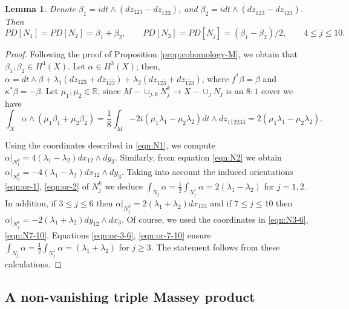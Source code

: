 \documentclass[10pt]{article}
\renewcommand{\b}{\beta}
\newcommand{\R}{\mathbb R}
\renewcommand{\b}{\beta}
\theoremstyle{plain}
\newtheorem{lem}[proposition]{Lemma}
\theoremstyle{definition}
\theoremstyle{remark}
\begin{document}
\begin{lem} \label{lem:PDuals}
Denote $\b_1=i dt\wedge (dz_{123} - dz_{\bar{1}\bar{2}\bar{3}})$, and  $\b_2=idt \wedge (dz_{12\bar{3}} - dz_{\bar{1}\bar{2}3})$. Then 
$$
PD[N_1]=PD[N_2]=\beta_1+\beta_2, \qquad 
PD[N_3]=PD[N_j]=(\beta_1 - \beta_2)/2, \qquad 4 \leq j \leq 10.
$$
\end{lem}
\begin{proof}
Following the proof of Proposition \ref{prop:cohomology-M}, we obtain that $\b_1,\beta_2\in H^4(X)$. Let $\alpha \in H^3(X)$; then, $\alpha=dt\wedge\beta + \lambda_1(dz_{123} + dz_{\bar{1}\bar{2}\bar{3}})+ \lambda_2( dz_{12\bar{3}} + dz_{\bar{1}\bar{2}{3}})$, where $f^*\beta=\beta$ and $\kappa^*\beta=-\beta$.  Let $\mu_1,\mu_2\in \R$, since $M-\cup_{j,k} N_j^k \to X-\cup_{j}N_j$ is an $8:1$ cover we have
$$
\int_X {\alpha \wedge (\mu_1\beta_1 + \mu_2\beta_2)}=
\frac{1}{8} \int_{M} {-2i(\mu_1 \lambda_1- \mu_2 \lambda_2)dt\wedge dz_{1\bar{1}2\bar{2}3\bar{3}}} =
2(\mu_1 \lambda_1- \mu_2 \lambda_2).
$$

Using the coordinates described in \eqref{eqn:N1}, we compute $\alpha|_{N_1^k}= 4(\lambda_1-\lambda_2)dx_{12} \wedge dy_3$. Similarly, from equation \eqref{eqn:N2} we obtain $\alpha|_{N_2^k}= -4(\lambda_1-\lambda_2)dx_{12}  \wedge dy_3$. Taking into account the induced orientations \eqref{eqn:or-1}, \eqref{eqn:or-2} of $N_j^k$ we deduce
$\int_{N_j}\alpha=\frac{1}{2}\int_{N_j^1}{\alpha}=2(\lambda_1 - \lambda_2)$ for $j=1,2$. In addition, if $3\leq j \leq  6$ then $\alpha|_{N_j^k}=2(\lambda_1+\lambda_2)dx_{123}$ and if $7\leq j \leq 10$ then $\alpha|_{N_j^k}=-2(\lambda_1+\lambda_2) dy_{12} \wedge dx_3$. Of course, we used the coordinates in 
\eqref{eqn:N3-6}, \eqref{eqn:N7-10}.
Equations \eqref{eqn:or-3-6}, \eqref{eqn:or-7-10} ensure
$\int_{N_j}\alpha=\frac{1}{2}\int_{N_j^1}{\alpha}=(\lambda_1 + \lambda_2)$ for $j\geq 3$. The statement follows from these calculations.
\end{proof}

\subsection{A non-vanishing triple Massey product}
\end{document}
